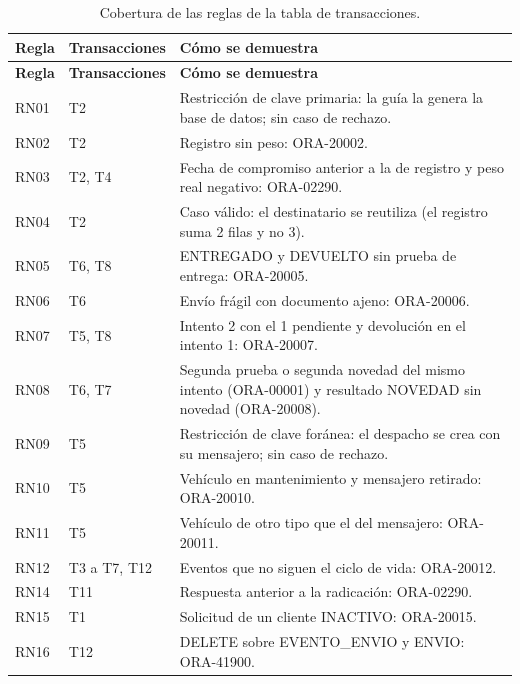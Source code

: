 {\singlespacing\small
\begin{longtable}{L{1.4cm} L{3.4cm} L{9.2cm}}
\caption{Cobertura de las reglas de la tabla de transacciones.}
\label{tab:proto-cobertura}\\
\toprule
\textbf{Regla} & \textbf{Transacciones} & \textbf{Cómo se demuestra} \\
\midrule
\endfirsthead
\toprule
\textbf{Regla} & \textbf{Transacciones} & \textbf{Cómo se demuestra} \\
\midrule
\endhead
\bottomrule
\endfoot
RN01 & T2 & Restricción de clave primaria: la guía la genera la base de datos; sin caso de rechazo. \\
RN02 & T2 & Registro sin peso: ORA-20002. \\
RN03 & T2, T4 & Fecha de compromiso anterior a la de registro y peso real negativo: ORA-02290. \\
RN04 & T2 & Caso válido: el destinatario se reutiliza (el registro suma 2 filas y no 3). \\
RN05 & T6, T8 & ENTREGADO y DEVUELTO sin prueba de entrega: ORA-20005. \\
RN06 & T6 & Envío frágil con documento ajeno: ORA-20006. \\
RN07 & T5, T8 & Intento 2 con el 1 pendiente y devolución en el intento 1: ORA-20007. \\
RN08 & T6, T7 & Segunda prueba o segunda novedad del mismo intento (ORA-00001) y resultado NOVEDAD sin novedad (ORA-20008). \\
RN09 & T5 & Restricción de clave foránea: el despacho se crea con su mensajero; sin caso de rechazo. \\
RN10 & T5 & Vehículo en mantenimiento y mensajero retirado: ORA-20010. \\
RN11 & T5 & Vehículo de otro tipo que el del mensajero: ORA-20011. \\
RN12 & T3 a T7, T12 & Eventos que no siguen el ciclo de vida: ORA-20012. \\
RN14 & T11 & Respuesta anterior a la radicación: ORA-02290. \\
RN15 & T1 & Solicitud de un cliente INACTIVO: ORA-20015. \\
RN16 & T12 & DELETE sobre EVENTO\_ENVIO y ENVIO: ORA-41900. \\
\end{longtable}
\par}


